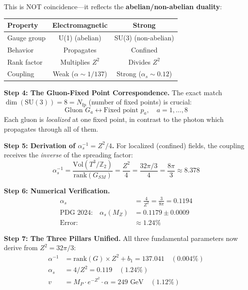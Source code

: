 \documentclass[12pt,a4paper]{article}
\newcommand{\Ztwo}{\mathbb{Z}_2}
\newcommand{\Tthree}{T^3}
\newcommand{\Zsq}{Z^2}
\begin{document}
This is NOT coincidence---it reflects the \textbf{abelian/non-abelian duality}:
\begin{center}
\begin{tabular}{lcc}
\toprule
\textbf{Property} & \textbf{Electromagnetic} & \textbf{Strong} \\
\midrule
Gauge group & U(1) (abelian) & SU(3) (non-abelian) \\
Behavior & Propagates & Confined \\
Rank factor & Multiplies $\Zsq$ & Divides $\Zsq$ \\
Coupling & Weak ($\alpha \sim 1/137$) & Strong ($\alpha_s \sim 0.12$) \\
\bottomrule
\end{tabular}
\end{center}

\textbf{Step 4: The Gluon-Fixed Point Correspondence.}
The exact match $\dim(\text{SU}(3)) = 8 = N_{\text{fp}}$ (number of fixed points) is crucial:
\begin{equation}
\text{Gluon } G_a \leftrightarrow \text{Fixed point } p_a, \quad a = 1, \ldots, 8
\end{equation}
Each gluon is \textit{localized} at one fixed point, in contrast to the photon which propagates through all of them.

\textbf{Step 5: Derivation of $\alpha_s^{-1} = \Zsq/4$.}
For localized (confined) fields, the coupling receives the \textit{inverse} of the spreading factor:
\begin{equation}
\alpha_s^{-1} = \frac{\text{Vol}(\Tthree/\Ztwo)}{\text{rank}(G_{SM})} = \frac{\Zsq}{4} = \frac{32\pi/3}{4} = \frac{8\pi}{3} \approx 8.378
\end{equation}

\textbf{Step 6: Numerical Verification.}
\begin{align}
\alpha_s &= \frac{4}{\Zsq} = \frac{3}{8\pi} = 0.1194 \\
\text{PDG 2024:} \quad \alpha_s(M_Z) &= 0.1179 \pm 0.0009 \\
\text{Error:} &\approx 1.24\%
\end{align}

\textbf{Step 7: The Three Pillars Unified.}
All three fundamental parameters now derive from $\Zsq = 32\pi/3$:
\begin{equation}
\boxed{
\begin{aligned}
\alpha^{-1} &= \text{rank}(G) \times \Zsq + b_1 = 137.041 \quad (0.004\%) \\
\alpha_s &= 4/\Zsq = 0.119 \quad (1.24\%) \\
v &= M_P \cdot e^{-\Zsq} \cdot \alpha = 249 \text{ GeV} \quad (1.12\%)
\end{aligned}
}
\end{equation}
\end{document}
